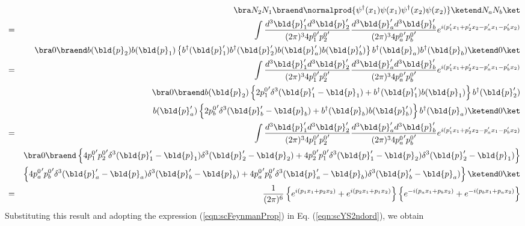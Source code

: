 \begin{eqnarray}
&&\bra N_2 N_1 \braend
\normalprod{
\psi^\dagger(x_1) \psi(x_1) 
\psi^\dagger(x_2) \psi(x_2)
}
\ketend N_a N_b \ket
\nonumber\\
&=&
\int \frac{d^3 \bld{p}_1' d^3 \bld{p}_2'}{(2\pi)^3 4 {p_1^0}' {p_2^0}'} 
 \frac{d^3 \bld{p}_a' d^3 \bld{p}_b'}{(2\pi)^3 4 {p_a^0}' {p_b^0}'} 
 e^{i(p_1' x_1 + p_2' x_2 - p_a' x_1 - p_b' x_2)}
\nonumber\\
&&
 \bra 0 \braend 
 b(\bld{p}_2)  b(\bld{p}_1) \left\{
 b^\dagger(\bld{p}_1') b^\dagger(\bld{p}_2')
b(\bld{p}_a') b(\bld{p}_b')
\right\}
 b^\dagger(\bld{p}_a) b^\dagger(\bld{p}_b)
 \ketend 0 \ket
\nonumber\\
&=&
\int \frac{d^3 \bld{p}_1' d^3 \bld{p}_2'}{(2\pi)^3 4 {p_1^0}' {p_2^0}'} 
 \frac{d^3 \bld{p}_a' d^3 \bld{p}_b'}{(2\pi)^3 4 {p_a^0}' {p_b^0}'} 
 e^{i(p_1' x_1 + p_2' x_2 - p_a' x_1 - p_b' x_2)}
\nonumber\\
&&
\bra 0 \braend 
 b(\bld{p}_2)  \left\{
 2{p_1^0}' \delta^3(\bld{p}_1' - \bld{p}_1) 
 + b^\dagger({\bld{p}_1'}) b({\bld{p}_1})
 \right\}
 b^\dagger({\bld{p}_2'})
 \nonumber\\
 &&
  b(\bld{p}_a')   \left\{
 2{p_b^0}' \delta^3(\bld{p}_b' - \bld{p}_b) 
 + b^\dagger({\bld{p}_b}) b({\bld{p}_b'})
  \right\}
  b^\dagger({\bld{p}_a})
   \ketend 0 \ket
\nonumber\\
&=&
\int \frac{d^3 \bld{p}_1' d^3 \bld{p}_2'}{(2\pi)^3 4 {p_1^0}' {p_2^0}'} 
 \frac{d^3 \bld{p}_a' d^3 \bld{p}_b'}{(2\pi)^3 4 {p_a^0}' {p_b^0}'} 
 e^{i(p_1' x_1 + p_2' x_2 - p_a' x_1 - p_b' x_2)}
\nonumber\\
&&
\bra 0 \braend 
\left\{
4{p_1^0}' {p_2^0}' \delta^3(\bld{p}_1' - \bld{p}_1) \delta^3(\bld{p}_2' - \bld{p}_2) 
+
4{p_2^0}' {p_1^0}' \delta^3(\bld{p}_1' - \bld{p}_2) \delta^3(\bld{p}_2' - \bld{p}_1) 
\right\}
\nonumber\\
&&
\left\{
4{p_a^0}' {p_b^0}' \delta^3(\bld{p}_a' - \bld{p}_a) \delta^3(\bld{p}_b' - \bld{p}_b) 
+
4{p_a^0}' {p_b^0}' \delta^3(\bld{p}_a' - \bld{p}_b) \delta^3(\bld{p}_b' - \bld{p}_a) 
\right\}
\ketend 0 \ket
\nonumber\\
&=&
\frac{1}{(2\pi)^6}
\left\{
e^{i(p_1 x_1 + p_2 x_2)} + e^{i(p_2 x_1 + p_1 x_2)}
\right\}
\left\{
e^{-i(p_a x_1 + p_b x_2)} + e^{-i(p_b x_1 + p_a x_2)}
\right\}
\nonumber
\end{eqnarray}
Substituting this result and adopting the expression (\ref{eqn:scFeynmanProp})
in Eq. (\ref{eqn:scYS2ndord}),
we obtain
